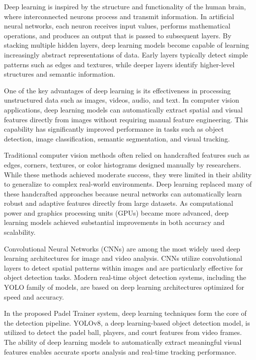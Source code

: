 Deep learning is inspired by the structure and functionality of the human brain, where interconnected neurons process and transmit information. In artificial neural networks, each neuron receives input values, performs mathematical operations, and produces an output that is passed to subsequent layers. By stacking multiple hidden layers, deep learning models become capable of learning increasingly abstract representations of data. Early layers typically detect simple patterns such as edges and textures, while deeper layers identify higher-level structures and semantic information.

One of the key advantages of deep learning is its effectiveness in processing unstructured data such as images, videos, audio, and text. In computer vision applications, deep learning models can automatically extract spatial and visual features directly from images without requiring manual feature engineering. This capability has significantly improved performance in tasks such as object detection, image classification, semantic segmentation, and visual tracking.

Traditional computer vision methods often relied on handcrafted features such as edges, corners, textures, or color histograms designed manually by researchers. While these methods achieved moderate success, they were limited in their ability to generalize to complex real-world environments. Deep learning replaced many of these handcrafted approaches because neural networks can automatically learn robust and adaptive features directly from large datasets. As computational power and graphics processing units (GPUs) became more advanced, deep learning models achieved substantial improvements in both accuracy and scalability.

Convolutional Neural Networks (CNNs) are among the most widely used deep learning architectures for image and video analysis. CNNs utilize convolutional layers to detect spatial patterns within images and are particularly effective for object detection tasks. Modern real-time object detection systems, including the YOLO family of models, are based on deep learning architectures optimized for speed and accuracy.

In the proposed Padel Trainer system, deep learning techniques form the core of the detection pipeline. YOLOv8, a deep learning-based object detection model, is utilized to detect the padel ball, players, and court features from video frames. The ability of deep learning models to automatically extract meaningful visual features enables accurate sports analysis and real-time tracking performance.

